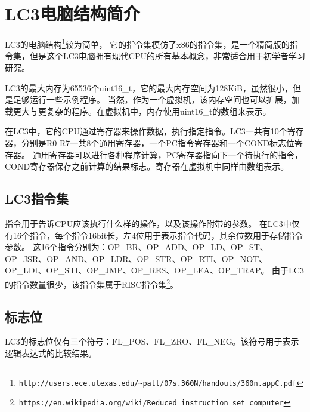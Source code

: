 \section{LC3电脑结构简介}

LC3的电脑结构\footnote{\nolinkurl{http://users.ece.utexas.edu/~patt/07s.360N/handouts/360n.appC.pdf}}较为简单，
它的指令集模仿了x86的指令集，是一个精简版的指令集，但是这个LC3电脑拥有现代CPU的所有基本概念，非常适合用于初学者学习研究。

LC3的最大内存为65536个uint16\_t，它的最大内存空间为128KiB，虽然很小，但是足够运行一些示例程序。
当然，作为一个虚拟机，该内存空间也可以扩展，加载更大与更复杂的程序。在虚拟机中，内存使用uint16\_t的数组来表示。

在LC3中，它的CPU通过寄存器来操作数据，执行指定指令。LC3一共有10个寄存器，分别是R0-R7一共8个通用寄存器，一个PC指令寄存器和一个COND标志位寄存器。
通用寄存器可以进行各种程序计算，PC寄存器指向下一个待执行的指令，COND寄存器保存之前计算的结果标志。寄存器在虚拟机中同样由数组表示。

\subsection{LC3指令集}

指令用于告诉CPU应该执行什么样的操作，以及该操作附带的参数。
在LC3中仅有16个指令，每个指令16bit长，左4位用于表示指令代码，其余位数用于存储指令参数。
这16个指令分别为：OP\_BR、OP\_ADD、OP\_LD、OP\_ST、OP\_JSR、OP\_AND、OP\_LDR、OP\_STR、OP\_RTI、OP\_NOT、OP\_LDI、OP\_STI、OP\_JMP、OP\_RES、OP\_LEA、OP\_TRAP。
由于LC3的指令数量很少，该指令集属于RISC指令集\footnote{\nolinkurl{https://en.wikipedia.org/wiki/Reduced_instruction_set_computer}}。

\subsection{标志位}

LC3的标志位仅有三个符号：FL\_POS、FL\_ZRO、FL\_NEG。该符号用于表示逻辑表达式的比较结果。
